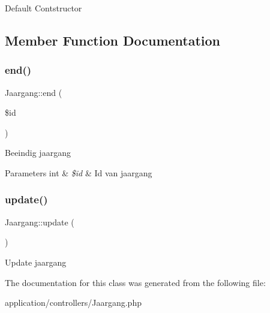 Default Contstructor 

\subsection{Member Function Documentation}
\mbox{\label{class_jaargang_a3186482529d41140d9367fb78cd1b119}} 
\subsubsection{\texorpdfstring{end()}{end()}}
{\footnotesize\ttfamily Jaargang\+::end (\begin{DoxyParamCaption}\item[{}]{\$id }\end{DoxyParamCaption})}

Beeindig jaargang 
\begin{DoxyParams}[1]{Parameters}
int & {\em \$id} & Id van jaargang \\
\hline
\end{DoxyParams}
\mbox{\label{class_jaargang_aaa73e406504c88e78c151e120f2e1097}} 
\subsubsection{\texorpdfstring{update()}{update()}}
{\footnotesize\ttfamily Jaargang\+::update (\begin{DoxyParamCaption}{ }\end{DoxyParamCaption})}

Update jaargang 

The documentation for this class was generated from the following file\+:\begin{DoxyCompactItemize}
\item 
application/controllers/Jaargang.\+php\end{DoxyCompactItemize}
